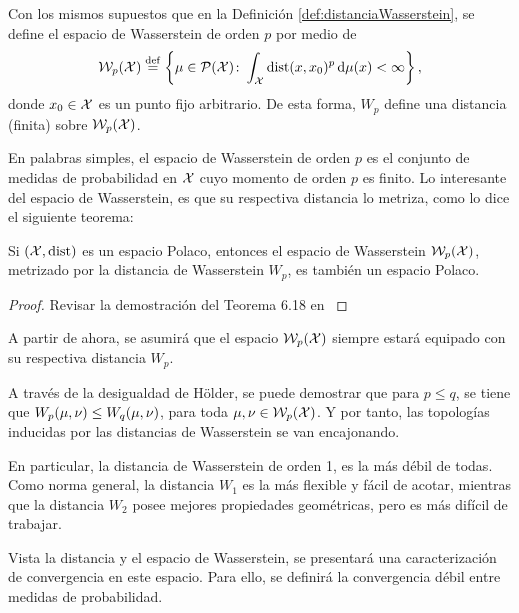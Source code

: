 {{	  \begin{definition}
		  Con los mismos supuestos que en la Definición \ref{def:distanciaWasserstein}, se define el espacio de Wasserstein de orden $p$ por medio de
		  \begin{equation}
			  \WassersteinSpace[p]{\cX} \eqdef \left\{
			  \mu \in \ProbSpace[\cX] \colon \int_{\cX} \dist(x, x_0)^{p} \dmu[x] < \infty
			  \right\},
		  \end{equation}
		  donde $x_0 \in \cX$ es un punto fijo arbitrario. De esta forma, $W_p$ define una distancia (finita) sobre $\WassersteinSpace[p]{\cX}$.
	  \end{definition}
	  En palabras simples, el espacio de Wasserstein de orden $p$ es el conjunto de medidas de probabilidad en $\cX$ cuyo momento de orden $p$ es finito. Lo interesante del espacio de Wasserstein, es que su respectiva distancia lo metriza, como lo dice el siguiente teorema:
	  \begin{theorem}\label{thm:espacioWassersteinEsMetrico}
		  Si $(\cX, \dist)$ es un espacio Polaco, entonces el espacio de Wasserstein $\WassersteinSpace[p]{\cX} $, metrizado por la distancia de Wasserstein $W_p$, es también un espacio Polaco.
	  \end{theorem}

	  \begin{proof}
		  Revisar la demostración del Teorema 6.18 en \cite[p. 105]{villani2009optimal}
	  \end{proof}

	  A partir de ahora, se asumirá que el espacio $\WassersteinSpace[p]{\cX} $ siempre estará equipado con su respectiva distancia $W_p$.

	  \begin{remark}
		  A través de la desigualdad de Hölder, se puede demostrar que para $p \leq q$, se tiene que $\Wasserstein[p]{\mu}{\nu} \leq \Wasserstein[q]{\mu}{\nu}$, para toda $\mu, \nu \in \WassersteinSpace[p]{\cX}$. Y por tanto, las topologías inducidas por las distancias de Wasserstein se van encajonando.

		  En particular, la distancia de Wasserstein de orden 1, es la más débil de todas. Como norma general, la distancia $W_1$  es la más flexible y fácil de acotar, mientras que la distancia $W_2$ posee mejores propiedades geométricas, pero es más difícil de trabajar.
	  \end{remark}

	  Vista la distancia y el espacio de Wasserstein, se presentará una caracterización de convergencia en este espacio. Para ello, se definirá la convergencia débil entre medidas de probabilidad.

}}
